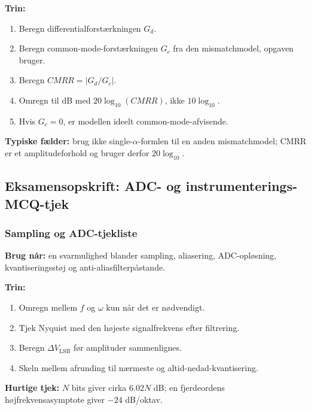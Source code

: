 \textbf{Trin:}
\begin{enumerate}
    \item Beregn differentialforstærkningen \(G_d\).
    \item Beregn common-mode-forstærkningen \(G_c\) fra den mismatchmodel, opgaven bruger.
    \item Beregn \(CMRR=|G_d/G_c|\).
    \item Omregn til dB med \(20\log_{10}(CMRR)\), ikke \(10\log_{10}\).
    \item Hvis \(G_c=0\), er modellen ideelt common-mode-afvisende.
\end{enumerate}

\textbf{Typiske fælder:} brug ikke single-\(\alpha\)-formlen til en anden mismatchmodel; CMRR er et amplitudeforhold og bruger derfor \(20\log_{10}\).

\subsection{Eksamensopskrift: ADC- og instrumenterings-MCQ-tjek}

\subsubsection{Sampling og ADC-tjekliste}
\textbf{Brug når:} en svarmulighed blander sampling, aliasering, ADC-opløsning, kvantiseringsstøj og anti-aliasfilterpåstande.

\textbf{Trin:}
\begin{enumerate}
    \item Omregn mellem \(f\) og \(\omega\) kun når det er nødvendigt.
    \item Tjek Nyquist med den højeste signalfrekvens efter filtrering.
    \item Beregn \(\Delta V_{\mathrm{LSB}}\) før amplituder sammenlignes.
    \item Skeln mellem afrunding til nærmeste og altid-nedad-kvantisering.
\end{enumerate}

\textbf{Hurtige tjek:} \(N\) bits giver cirka \(6.02N\) dB; en fjerdeordens højfrekvensasymptote giver \(-24\) dB/oktav.
